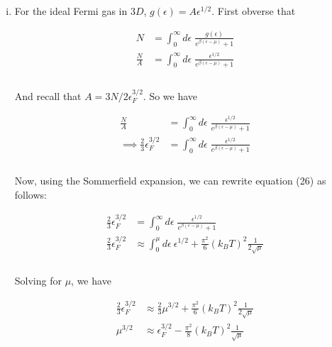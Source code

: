 \documentclass[]{article}
\begin{document}
\begin{enumerate}[i.]

\item For the ideal Fermi gas in $3D$, $g(\epsilon) = A \epsilon^{1/2} $. First obverse that

\begin{equation}\label{eq:25}
\begin{aligned}
N & = \int_0^\infty d\epsilon \; \frac{ g(\epsilon) }{e^{\beta(\epsilon - \mu)} +1 } \\
\frac{N}{A} & =  \int_0^\infty d\epsilon \; \frac{ \epsilon^{1/2} }{e^{\beta(\epsilon - \mu)} +1 } \\
\end{aligned}
\end{equation}\\

And recall that $A =  3N/ 2\epsilon_F^{3/2}$. So we have

\begin{equation}\label{eq:26}
\begin{aligned}
\frac{N}{A} & =  \int_0^\infty d\epsilon \; \frac{ \epsilon^{1/2} }{e^{\beta(\epsilon - \mu)} +1 } \\
\implies  \frac{2}{3} \epsilon_F^{3/2} & =  \int_0^\infty d\epsilon \; \frac{ \epsilon^{1/2} }{e^{\beta(\epsilon - \mu)} +1 } \\
\end{aligned}
\end{equation}\\

Now, using the Sommerfield expansion, we can rewrite equation (26) as follows:

\begin{equation}\label{eq:27}
\begin{aligned}
\frac{2}{3} \epsilon_F^{3/2} & =  \int_0^\infty d\epsilon \; \frac{ \epsilon^{1/2} }{e^{\beta(\epsilon - \mu)} +1 } \\
\frac{2}{3} \epsilon_F^{3/2} & \approx \int_0^\mu d\epsilon \: \epsilon^{1/2} + \frac{\pi^2}{6} (k_B T)^2 \frac{1}{2\sqrt{\mu}} \\ 
\end{aligned}
\end{equation}\\

Solving for $\mu$, we have 

\begin{equation}\label{eq:28}
\begin{aligned}
\frac{2}{3} \epsilon_F^{3/2} & \approx \frac{2}{3} \mu^{3/2} + \frac{\pi^2}{6} (k_B T)^2 \frac{1}{2\sqrt{\mu}} \\ 
\mu^{3/2} & \approx  \epsilon_F^{3/2} -  \frac{\pi^2}{8} (k_B T)^2 \frac{1}{\sqrt{\mu}} 
\end{aligned}
\end{equation}\\


\end{enumerate}
\end{document}
